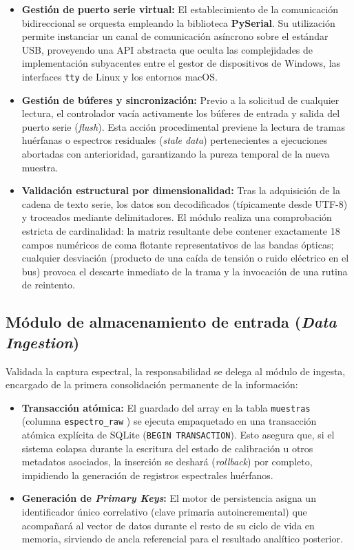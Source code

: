 \begin{itemize}
    \item \textbf{Gestión de puerto serie virtual:} El establecimiento de la comunicación bidireccional se orquesta empleando la biblioteca \textbf{PySerial\cite{pyserial2023docs}}. Su utilización permite instanciar un canal de comunicación asíncrono sobre el estándar USB, proveyendo una API abstracta que oculta las complejidades de implementación subyacentes entre el gestor de dispositivos de Windows, las interfaces \texttt{tty} de Linux y los entornos macOS.
    \item \textbf{Gestión de búferes y sincronización:} Previo a la solicitud de cualquier lectura, el controlador vacía activamente los búferes de entrada y salida del puerto serie (\textit{flush}). Esta acción procedimental previene la lectura de tramas huérfanas o espectros residuales (\textit{stale data}) pertenecientes a ejecuciones abortadas con anterioridad, garantizando la pureza temporal de la nueva muestra.
    \item \textbf{Validación estructural por dimensionalidad:} Tras la adquisición de la cadena de texto serie, los datos son decodificados (típicamente desde UTF-8) y troceados mediante delimitadores. El módulo realiza una comprobación estricta de cardinalidad: la matriz resultante debe contener exactamente 18 campos numéricos de coma flotante representativos de las bandas ópticas; cualquier desviación (producto de una caída de tensión o ruido eléctrico en el bus) provoca el descarte inmediato de la trama y la invocación de una rutina de reintento.
\end{itemize}

\subsection*{Módulo de almacenamiento de entrada (\textit{Data Ingestion})}

Validada la captura espectral, la responsabilidad se delega al módulo de ingesta, encargado de la primera consolidación permanente de la información:

\begin{itemize}
    \item \textbf{Transacción atómica:} El guardado del array en la tabla \texttt{muestras} (columna \texttt{espectro\_raw} ) se ejecuta empaquetado en una transacción atómica explícita de SQLite (\texttt{BEGIN TRANSACTION}). Esto asegura que, si el sistema colapsa durante la escritura del estado de calibración u otros metadatos asociados, la inserción se deshará (\textit{rollback}) por completo, impidiendo la generación de registros espectrales huérfanos.
    \item \textbf{Generación de \textit{Primary Keys}:} El motor de persistencia asigna un identificador único correlativo (clave primaria autoincremental) que acompañará al vector de datos durante el resto de su ciclo de vida en memoria, sirviendo de ancla referencial para el resultado analítico posterior.
\end{itemize}

